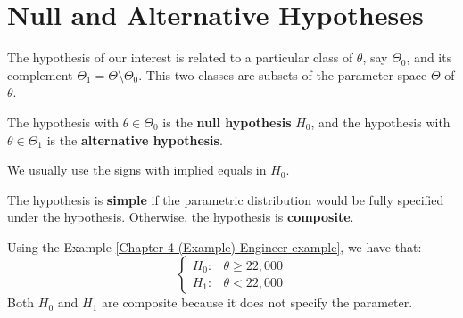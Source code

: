 \documentclass{huhtakm-template-book-v2}
\begin{document}
\section{Null and Alternative Hypotheses}
The hypothesis of our interest is related to a particular class of $\theta$, say $\Theta_{0}$, and its complement $\Theta_{1}=\Theta\setminus\Theta_{0}$. This two classes are subsets of the parameter space $\Theta$ of $\theta$.
\begin{defn}
	The hypothesis with $\theta\in\Theta_{0}$ is the \textbf{null hypothesis} $H_{0}$, and the hypothesis with $\theta\in\Theta_{1}$ is the \textbf{alternative hypothesis}.
\end{defn}
\begin{rem}
	We usually use the signs with implied equals in $H_{0}$.
\end{rem}
\begin{defn}
	The hypothesis is \textbf{simple} if the parametric distribution would be fully specified under the hypothesis. Otherwise, the hypothesis is \textbf{composite}.
\end{defn}
\begin{eg}
	Using the Example \ref{Chapter 4 (Example) Engineer example}, we have that:
	\begin{equation*}
		\begin{cases}
			H_{0}: & \theta\geq 22,000\\
			H_{1}: & \theta<22,000
		\end{cases}
	\end{equation*}
	Both $H_{0}$ and $H_{1}$ are composite because it does not specify the parameter.
\end{eg}
\end{document}
